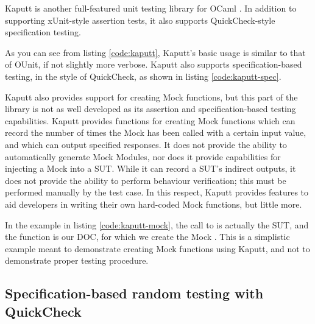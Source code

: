 Kaputt is another full-featured unit testing library for OCaml
\cite{www:kaputt}. In addition to supporting xUnit-style assertion
tests, it also supports QuickCheck-style specification testing.




As you can see from listing \ref{code:kaputt}, Kaputt's basic usage is
similar to that of OUnit, if not slightly more verbose. Kaputt also
supports specification-based testing, in the style of QuickCheck, as
shown in listing \ref{code:kaputt-spec}.



Kaputt also provides support for creating Mock functions, but this
part of the library is not as well developed as its assertion and
specification-based testing capabilities. Kaputt provides functions
for creating Mock functions which can record the number of times the
Mock has been called with a certain input value, and which can output
specified responses. It does not provide the ability to automatically
generate Mock Modules, nor does it provide capabilities for injecting
a Mock into a SUT. While it can record a SUT's indirect outputs, it
does not provide the ability to perform behaviour verification; this
must be performed manually by the test case. In this respect, Kaputt
provides features to aid developers in writing their own hard-coded
Mock functions, but little more.



In the example in listing \ref{code:kaputt-mock}, the call to
 is actually the SUT, and the function  is
our DOC, for which we create the Mock . This is a simplistic
example meant to demonstrate creating Mock functions using Kaputt, and
not to demonstrate proper testing procedure.

\subsection{Specification-based random testing with QuickCheck}

